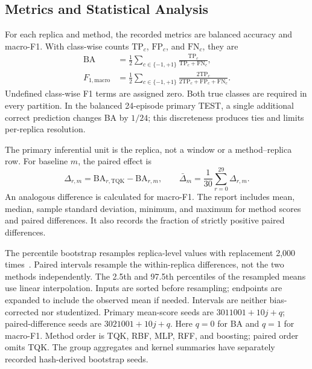 \subsection{Metrics and Statistical Analysis}
\label{sec:methods-statistics}

For each replica and method, the recorded metrics are balanced accuracy and macro-F1. With class-wise counts $\mathrm{TP}_c$, $\mathrm{FP}_c$, and $\mathrm{FN}_c$, they are
\begin{align}
 \mathrm{BA}&=\frac{1}{2}\sum_{c\in\{-1,+1\}}
 \frac{\mathrm{TP}_c}{\mathrm{TP}_c+\mathrm{FN}_c},\label{eq:balanced-accuracy}\\
 F_{1,\mathrm{macro}}&=\frac{1}{2}\sum_{c\in\{-1,+1\}}
 \frac{2\mathrm{TP}_c}{2\mathrm{TP}_c+\mathrm{FP}_c+\mathrm{FN}_c}.
 \label{eq:macro-f1}
\end{align}
Undefined class-wise F1 terms are assigned zero. Both true classes are required in every partition. In the balanced 24-episode primary TEST, a single additional correct prediction changes BA by $1/24$; this discreteness produces ties and limits per-replica resolution.

The primary inferential unit is the replica, not a window or a method--replica row. For baseline $m$, the paired effect is
\begin{equation}
 \Delta_{r,m}=\mathrm{BA}_{r,\mathrm{TQK}}-\mathrm{BA}_{r,m},
 \qquad \bar\Delta_m=\frac{1}{30}\sum_{r=0}^{29}\Delta_{r,m}.
 \label{eq:paired-effect}
\end{equation}
An analogous difference is calculated for macro-F1. The report includes mean, median, sample standard deviation, minimum, and maximum for method scores and paired differences. It also records the fraction of strictly positive paired differences.

The percentile bootstrap resamples replica-level values with replacement 2,000 times~\cite{efron1979bootstrap}. Paired intervals resample the within-replica differences, not the two methods independently. The 2.5th and 97.5th percentiles of the resampled means use linear interpolation. Inputs are sorted before resampling; endpoints are expanded to include the observed mean if needed. Intervals are neither bias-corrected nor studentized. Primary mean-score seeds are $3011001+10j+q$; paired-difference seeds are $3021001+10j+q$. Here $q=0$ for BA and $q=1$ for macro-F1. Method order is TQK, RBF, MLP, RFF, and boosting; paired order omits TQK. The group aggregates and kernel summaries have separately recorded hash-derived bootstrap seeds.

